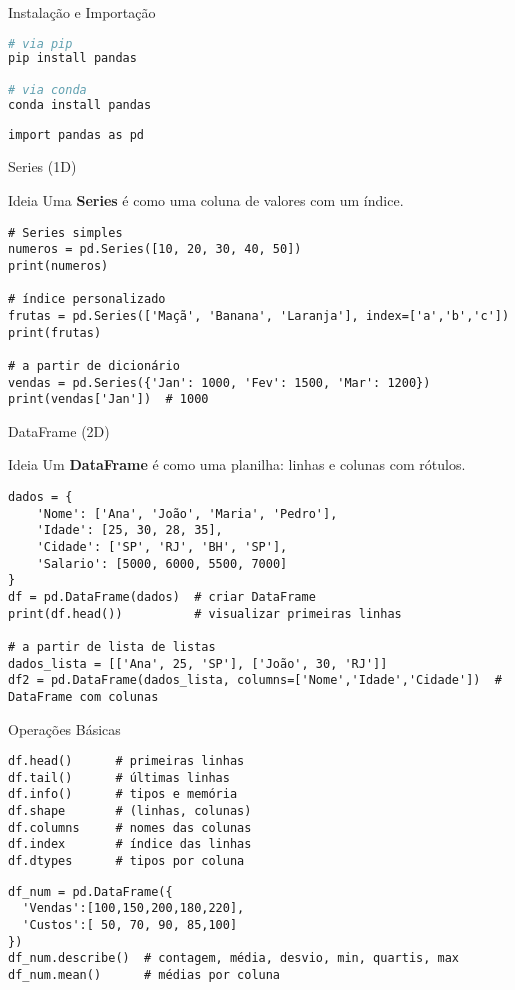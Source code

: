 \documentclass[aspectratio=169]{beamer}
\begin{document}
\begin{frame}[fragile]{Instalação e Importação}
\begin{lstlisting}[language=sh]
# via pip
pip install pandas

# via conda
conda install pandas
\end{lstlisting}
\vspace{0.4em}
\begin{lstlisting}
import pandas as pd
\end{lstlisting}
\end{frame}

\begin{frame}[fragile]{Series (1D)}
  \begin{block}{Ideia}
    Uma \textbf{Series} é como uma coluna de valores com um índice.
  \end{block}
\begin{lstlisting}
# Series simples
numeros = pd.Series([10, 20, 30, 40, 50])
print(numeros)

# índice personalizado
frutas = pd.Series(['Maçã', 'Banana', 'Laranja'], index=['a','b','c'])
print(frutas)

# a partir de dicionário
vendas = pd.Series({'Jan': 1000, 'Fev': 1500, 'Mar': 1200})
print(vendas['Jan'])  # 1000
\end{lstlisting}
\end{frame}

\begin{frame}[fragile]{DataFrame (2D)}
  \begin{block}{Ideia}
    Um \textbf{DataFrame} é como uma planilha: linhas e colunas com rótulos.
  \end{block}
\begin{lstlisting}
dados = {
    'Nome': ['Ana', 'João', 'Maria', 'Pedro'],
    'Idade': [25, 30, 28, 35],
    'Cidade': ['SP', 'RJ', 'BH', 'SP'],
    'Salario': [5000, 6000, 5500, 7000]
}
df = pd.DataFrame(dados)  # criar DataFrame
print(df.head())          # visualizar primeiras linhas

# a partir de lista de listas
dados_lista = [['Ana', 25, 'SP'], ['João', 30, 'RJ']]
df2 = pd.DataFrame(dados_lista, columns=['Nome','Idade','Cidade'])  # DataFrame com colunas
\end{lstlisting}
\end{frame}

\begin{frame}[fragile]{Operações Básicas}
\begin{lstlisting}
df.head()      # primeiras linhas
df.tail()      # últimas linhas
df.info()      # tipos e memória
df.shape       # (linhas, colunas)
df.columns     # nomes das colunas
df.index       # índice das linhas
df.dtypes      # tipos por coluna
\end{lstlisting}
\vspace{0.4em}
\begin{lstlisting}
df_num = pd.DataFrame({
  'Vendas':[100,150,200,180,220],
  'Custos':[ 50, 70, 90, 85,100]
})
df_num.describe()  # contagem, média, desvio, min, quartis, max
df_num.mean()      # médias por coluna
\end{lstlisting}
\end{frame}
\end{document}
